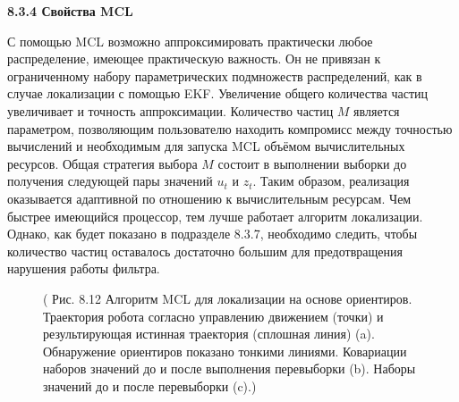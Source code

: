 \documentclass[10pt,a4paper]{article}
\begin{document}
\textbf{8.3.4	Свойства MCL}

С помощью MCL возможно аппроксимировать практически любое распределение, имеющее практическую важность. Он не привязан к ограниченному набору параметрических подмножеств распределений, как в случае локализации с помощью EKF. Увеличение общего количества частиц увеличивает и точность аппроксимации. Количество частиц $M$ является параметром, позволяющим пользователю находить компромисс между точностью вычислений и необходимым для запуска MCL объёмом вычислительных ресурсов. Общая стратегия выбора $M$ состоит в выполнении выборки до получения следующей пары значений $u_t$ и $z_t$. Таким образом, реализация оказывается адаптивной по отношению к вычислительным ресурсам. Чем быстрее имеющийся процессор, тем лучше работает алгоритм локализации. Однако, как будет показано в подразделе 8.3.7, необходимо следить, чтобы количество частиц оставалось достаточно большим для предотвращения нарушения работы фильтра.

\begin{figure}[H]
	\caption{ ( Рис. 8.12 Алгоритм MCL для локализации на основе ориентиров. Траектория робота согласно управлению движением (точки) и результирующая истинная траектория (сплошная линия) (a). Обнаружение ориентиров показано тонкими линиями.  Ковариации наборов значений до и после выполнения перевыборки (b). Наборы значений до и после перевыборки (c).)}
	\label{fig:812orig}
\end{figure}
\end{document}
